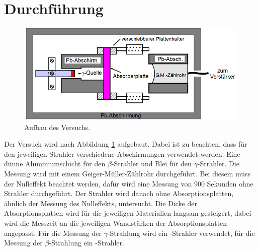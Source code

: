 \section{Durchführung}
\label{sec:Durchführung}
\begin{figure}[H]
    \centering
    \includegraphics[width=\textwidth]{content/Aufbau.png}
    \caption{Aufbau des Versuchs. \cite{v704}}
    \label{fig:mess}
\end{figure}
\noindent
Der Versuch wird nach Abbildung \ref{fig:mess} aufgebaut.
Dabei ist zu beachten, dass für  den jeweiligen Strahler verschiedene Abschirmungen verwendet werden.
Eine dünne Aluminiumschicht für den $\beta$-Strahler und Blei für den $\gamma$-Strahler.
Die Messung wird mit einem Geiger-Müller-Zählrohr durchgeführt.
Bei diesem muss der Nulleffekt beachtet werden, dafür wird eine Messung von 900 Sekunden ohne Strahler durchgeführt.
Der Strahler wird danach ohne Absorptionsplatten, ähnlich der Messung des Nulleffekts, untersucht.
Die Dicke der Absorptionsplatten wird für die jeweiligen Materialien langsam gesteigert, 
dabei wird die Messzeit an die jeweiligen Wandstärken der Absorptionsplatten angepasst.
Für die Messung der $\gamma$-Strahlung wird ein -Strahler verwendet, für die Messung der $\beta$-Strahlung ein -Strahler.
